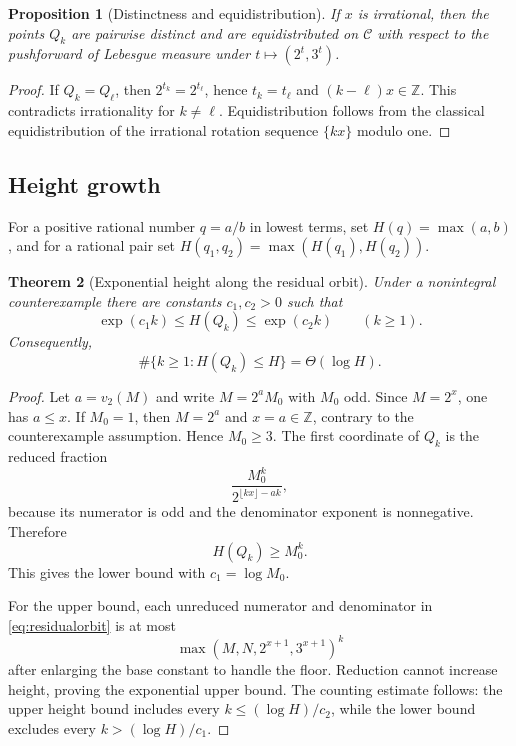 \documentclass[11pt,oneside]{article}
\newtheorem{theorem}{Theorem}[section]
\newtheorem{proposition}[theorem]{Proposition}
\theoremstyle{definition}
\newcommand{\Z}{\mathbb{Z}}
\newcommand{\cC}{\mathscr{C}}
\begin{document}
\begin{proposition}[Distinctness and equidistribution]\label{prop:residualequid}
If $x$ is irrational, then the points $Q_k$ are pairwise distinct and are equidistributed on $\cC$ with respect to the pushforward of Lebesgue measure under $t\mapsto(2^t,3^t)$.
\end{proposition}

\begin{proof}
If $Q_k=Q_\ell$, then $2^{t_k}=2^{t_\ell}$, hence
$t_k=t_\ell$ and $(k-\ell)x\in\Z$.  This contradicts irrationality for $k\ne\ell$.  Equidistribution follows from the classical equidistribution of the irrational rotation sequence $\{kx\}$ modulo one.
\end{proof}

\subsection{Height growth}

For a positive rational number $q=a/b$ in lowest terms, set
$H(q)=\max(a,b)$, and for a rational pair set
$H(q_1,q_2)=\max(H(q_1),H(q_2))$.

\begin{theorem}[Exponential height along the residual orbit]\label{thm:heightgrowth}
Under a nonintegral counterexample there are constants $c_1,c_2>0$ such that
\[
       \exp(c_1k)\le H(Q_k)\le\exp(c_2k)
       \qquad(k\ge1).
\]
Consequently,
\begin{equation}\label{eq:linearlogcount}
   \#\{k\ge1:H(Q_k)\le H\}=\Theta(\log H).
\end{equation}
\end{theorem}

\begin{proof}
Let $a=v_2(M)$ and write $M=2^aM_0$ with $M_0$ odd.  Since $M=2^x$, one has $a\le x$.  If $M_0=1$, then $M=2^a$ and $x=a\in\Z$, contrary to the counterexample assumption.  Hence $M_0\ge3$.  The first coordinate of $Q_k$ is the reduced fraction
\[
      \frac{M_0^k}{2^{\lfloor kx\rfloor-ak}},
\]
because its numerator is odd and the denominator exponent is nonnegative.  Therefore
\[
      H(Q_k)\ge M_0^k.
\]
This gives the lower bound with $c_1=\log M_0$.

For the upper bound, each unreduced numerator and denominator in
\eqref{eq:residualorbit} is at most
\[
       \max(M,N,2^{x+1},3^{x+1})^k
\]
after enlarging the base constant to handle the floor.  Reduction cannot increase height, proving the exponential upper bound.  The counting estimate follows: the upper height bound includes every $k\le (\log H)/c_2$, while the lower bound excludes every $k>(\log H)/c_1$.
\end{proof}
\end{document}
